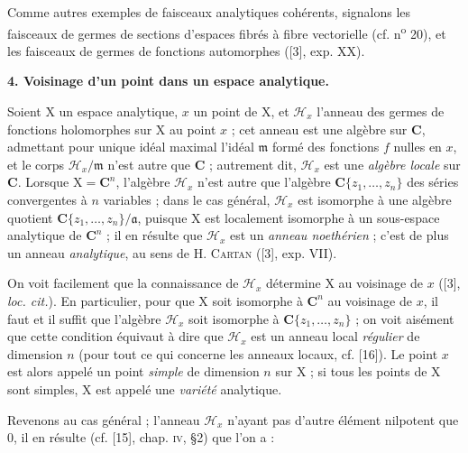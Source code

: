 Comme autres exemples de faisceaux analytiques cohérents, signalons les faisceaux de germes de sections d'espaces fibrés à fibre vectorielle (cf. n\textsuperscript{o} 20), et les faisceaux de germes de fonctions automorphes ([3], exp. XX).


\textbf{4. Voisinage d'un point dans un espace analytique.}

Soient $\mathrm{X}$ un espace analytique, $x$ un point de $\mathrm{X}$, et $\mathcal{H}_x$ l'anneau des germes de fonctions holomorphes sur $\mathrm{X}$ au point $x$ ; cet anneau est une algèbre sur $\mathbf{C}$, admettant pour unique idéal maximal l'idéal $\mathfrak{m}$ formé des fonctions $f$ nulles en $x$, et le corps $\mathcal{H}_x/\mathfrak{m}$ n'est autre que $\mathbf{C}$ ; autrement dit, $\mathcal{H}_x$ est une \textit{algèbre locale} sur $\mathbf{C}$. Lorsque $\mathrm{X} = \mathbf{C}^n$, l'algèbre $\mathcal{H}_x$ n'est autre que l'algèbre $\mathbf{C}\{z_1, \ldots, z_n\}$ des séries convergentes à $n$ variables ; dans le cas général, $\mathcal{H}_x$ est isomorphe à une algèbre quotient $\mathbf{C}\{z_1, \ldots, z_n\}/\mathfrak{a}$, puisque $\mathrm{X}$ est localement isomorphe à un sous-espace analytique de $\mathbf{C}^n$ ; il en résulte que $\mathcal{H}_x$ est un \textit{anneau noethérien} ; c'est de plus un anneau \textit{analytique}, au sens de H. \textsc{Cartan} ([3], exp. VII).

On voit facilement que la connaissance de $\mathcal{H}_x$ détermine $\mathrm{X}$ au voisinage de $x$ ([3], \textit{loc. cit.}). En particulier, pour que $\mathrm{X}$ soit isomorphe à $\mathbf{C}^n$ au voisinage de $x$, il faut et il suffit que l'algèbre $\mathcal{H}_x$ soit isomorphe à $\mathbf{C}\{z_1, \ldots, z_n\}$ ; on voit aisément que cette condition équivaut à dire que $\mathcal{H}_x$ est un anneau local \textit{régulier} de dimension $n$ (pour tout ce qui concerne les anneaux locaux, cf. [16]). Le point $x$ est alors appelé un point \textit{simple} de dimension $n$ sur $\mathrm{X}$ ; si tous les points de $\mathrm{X}$ sont simples, $\mathrm{X}$ est appelé une \textit{variété} analytique.

Revenons au cas général ; l'anneau $\mathcal{H}_x$ n'ayant pas d'autre élément nilpotent que 0, il en résulte (cf. [15], chap. \textsc{iv}, \S 2) que l'on a :

